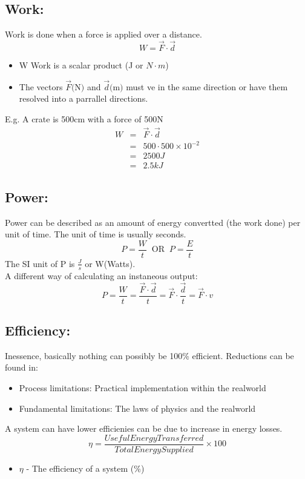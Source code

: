 \documentclass[a5paper]{report}
\begin{document}
	\subsection*{Work:}
	Work is done when a force is applied over a distance.
	$$W = \vec{F}\cdot \vec{d}$$
	\begin{itemize}
		\item W \- Work is a scalar product (J or $N\cdot m$)
		\item The vectors $\vec{F}\text{(N)}$ and $\vec{d}\text{(m)}$ must ve in the same direction or have them resolved into a parrallel directions.
	\end{itemize}
	E.g. A crate is 500cm with a force of 500N
	\begin{eqnarray*}
		W &=& \vec{F}\cdot \vec{d} \\
		  &=& 500\cdot 500\times10^{-2} \\
		  &=& 2500J \\
		  &=& 2.5kJ
	\end{eqnarray*}
	\subsection*{Power:}
	Power can be described as an amount of energy convertted (the work done) per unit of time. The unit of time is usually seconds.
	$$P=\frac{W}{t}\;\;\text{OR}\;\;P=\frac{E}{t}$$
	The SI unit of P is $\frac{J}{s}$ or W(Watts).\\
	A different way of calculating an instaneous output:
	$$P=\frac{W}{t}=\frac{\vec{F}\cdot\vec{d}}{t}=\vec{F}\cdot\frac{\vec{d}}{t}=\vec{F}\cdot v$$
	\subsection*{Efficiency:}
	Inessence, basically nothing can possibly be 100\% efficient. Reductions can be found in:
	\begin{itemize}
		\item Process limitations: Practical implementation within the realworld
		\item Fundamental limitations: The laws of physics and the realworld
	\end{itemize}
	A system can have lower efficienies can be due to increase in energy losses.
	$$\eta = \frac{Useful Energy Transferred}{Total Energy Supplied} \times 100$$
	\begin{itemize}
		\item $\eta$ - The efficiency of a system (\%)
	\end{itemize}
\end{document}

